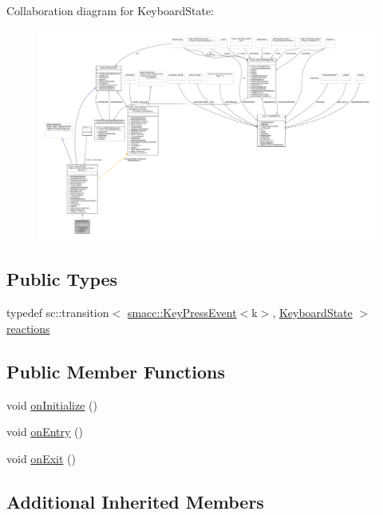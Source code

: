 Collaboration diagram for Keyboard\+State\+:
\nopagebreak
\begin{figure}[H]
\begin{center}
\leavevmode
\includegraphics[width=350pt]{structKeyboardState__coll__graph}
\end{center}
\end{figure}
\subsection*{Public Types}
\begin{DoxyCompactItemize}
\item 
typedef sc\+::transition$<$ \hyperlink{structsmacc_1_1KeyPressEvent}{smacc\+::\+Key\+Press\+Event}$<$\textquotesingle{}k\textquotesingle{}$>$, \hyperlink{structKeyboardState}{Keyboard\+State} $>$ \hyperlink{structKeyboardState_aa0fbf8cc627e65bbf82c327713cbf778}{reactions}
\end{DoxyCompactItemize}
\subsection*{Public Member Functions}
\begin{DoxyCompactItemize}
\item 
void \hyperlink{structKeyboardState_ab8bbd42dc0b4916ce2ebd2e5cbb772a6}{on\+Initialize} ()
\item 
void \hyperlink{structKeyboardState_a6c914773612dfabf146243cea8decfd0}{on\+Entry} ()
\item 
void \hyperlink{structKeyboardState_a365567740556b32391d90561345c51a8}{on\+Exit} ()
\end{DoxyCompactItemize}
\subsection*{Additional Inherited Members}


